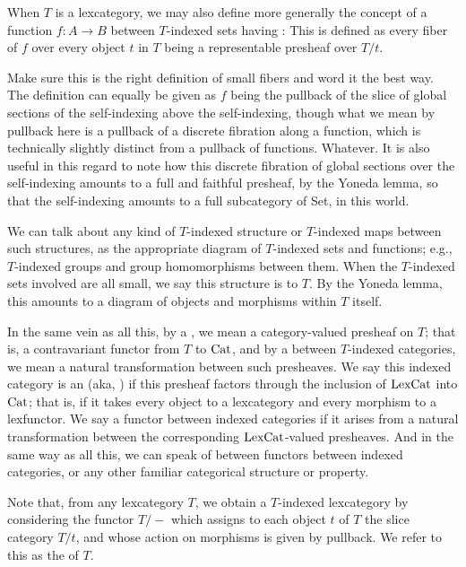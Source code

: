 When $T$ is a lexcategory, we may also define more generally the concept of a function $f : A \to B$ between $T$-indexed sets having : This is defined as every fiber of $f$ over every object $t$ in $T$ being a representable presheaf over $T/t$.

\begin{TODOblock}
Make sure this is the right definition of small fibers and word it the best way. The definition can equally be given as $f$ being the pullback of the slice of global sections of the self-indexing above the self-indexing, though what we mean by pullback here is a pullback of a discrete fibration along a function, which is technically slightly distinct from a pullback of functions. Whatever. It is also useful in this regard to note how this discrete fibration of global sections over the self-indexing amounts to a full and faithful presheaf, by the Yoneda lemma, so that the self-indexing amounts to a full subcategory of Set, in this world.
\end{TODOblock}

We can talk about any kind of $T$-indexed structure or $T$-indexed maps between such structures, as the appropriate diagram of $T$-indexed sets and functions; e.g., $T$-indexed groups and group homomorphisms between them. When the $T$-indexed sets involved are all small, we say this structure is  to $T$. By the Yoneda lemma, this amounts to a diagram of objects and morphisms within $T$ itself.

In the same vein as all this, by a , we mean a category-valued presheaf on $T$; that is, a contravariant functor from $T$ to $\mathrm{Cat}$, and by a  between $T$-indexed categories, we mean a natural transformation between such presheaves. We say this indexed category is an  (aka, ) if this presheaf factors through the inclusion of $\mathrm{LexCat}$ into $\mathrm{Cat}$; that is, if it takes every object to a lexcategory and every morphism to a lexfunctor. We say a functor between indexed categories  if it arises from a natural transformation between the corresponding $\mathrm{LexCat}$-valued presheaves. And in the same way as all this, we can speak of  between functors between indexed categories, or any other familiar categorical structure or property.

Note that, from any lexcategory $T$, we obtain a $T$-indexed lexcategory by considering the functor $T/-$ which assigns to each object $t$ of $T$ the slice category $T/t$, and whose action on morphisms is given by pullback. We refer to this as the  of $T$.

